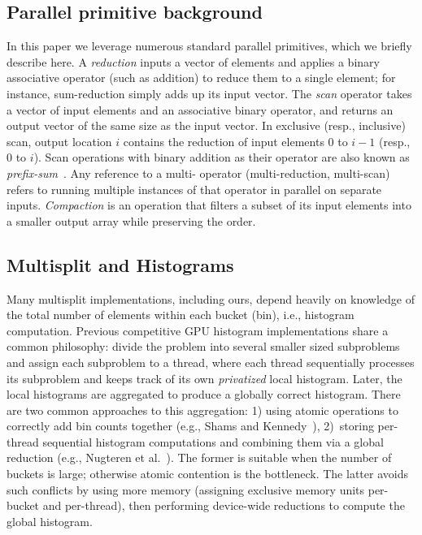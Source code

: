 \subsection{Parallel primitive background}
In this paper we leverage numerous standard parallel primitives, which we briefly describe here. A \emph{reduction} inputs a vector of elements and applies a binary associative operator (such as addition) to reduce them to a single element; for instance, sum-reduction simply adds up its input vector.
The \emph{scan} operator takes a vector of input elements and an associative binary operator, and returns an output vector of the same size as the input vector.
In exclusive (resp., inclusive) scan, output location $i$ contains the reduction of input elements 0 to $i-1$ (resp., 0 to $i$).
Scan operations with binary addition as their operator are also known as \emph{prefix-sum}~\cite{Harris:2007:PPS:nourl}.
Any reference to a multi- operator (multi-reduction, multi-scan) refers to running multiple instances of that operator in parallel on separate inputs. \emph{Compaction} is an operation that filters a subset of its input elements into a smaller output array while preserving the order.

\subsection{Multisplit and Histograms}
Many multisplit implementations, including ours, depend heavily on knowledge of the total number of elements within each bucket (bin), i.e., histogram computation.
Previous competitive GPU histogram implementations share a common philosophy: divide the problem into several smaller sized subproblems and assign each subproblem to a thread, where each thread sequentially processes its subproblem and keeps track of its own \emph{privatized} local histogram.
Later, the local histograms are aggregated to produce a globally correct histogram.
There are two common approaches to this aggregation: 1) using atomic operations to correctly add bin counts together (e.g., Shams and Kennedy~), 2)~storing per-thread sequential histogram computations and combining them via a global reduction (e.g., Nugteren et al.~).
The former is suitable when the number of buckets is large; otherwise atomic contention is the bottleneck.
The latter avoids such conflicts by using more memory (assigning exclusive memory units per-bucket and per-thread), then performing device-wide reductions to compute the global histogram.

